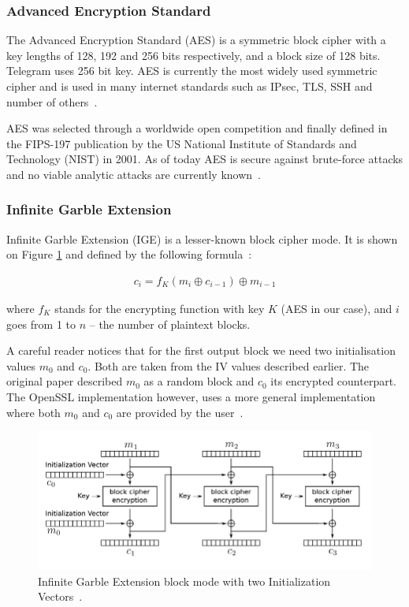 \documentclass[thesis=M,english]{FITthesis}[2012/10/20]
\begin{document}
\subsubsection{Advanced Encryption Standard}

The Advanced Encryption Standard (AES) is a symmetric block cipher with a key lengths of 128, 192 and 256 bits respectively, and a block size of 128 bits. Telegram uses 256 bit key. AES is currently the most widely used symmetric cipher and is used in many internet standards such as IPsec, TLS, SSH and number of others~\cite{understanding-crypto}.

AES was selected through a worldwide open competition and finally defined in the FIPS-197 publication by the US National Institute of Standards and Technology (NIST) in 2001. As of today AES is secure against brute-force attacks and no viable analytic attacks are currently known~\cite{understanding-crypto}.

\subsubsection{Infinite Garble Extension}

Infinite Garble Extension (IGE) is a lesser-known block cipher mode. It is shown on Figure \ref{img:crypto-regular-ige-enc} and defined by the following formula~\cite{telegram-openssl-ige}:

\begin{gather*}
c_i = f_K(m_i \oplus c_{i-1}) \oplus m_{i-1}
\end{gather*}

where $f_K$ stands for the encrypting function with key $K$ (AES in our case), and $i$ goes from 1 to $n$ -- the number of plaintext blocks.

A careful reader notices that for the first output block we need two initialisation values $m_0$ and $c_0$. Both are taken from the IV values described earlier. The original paper described $m_0$ as a random block and $c_0$ its encrypted counterpart. The OpenSSL implementation however, uses a more general implementation where both $m_0$ and $c_0$ are provided by the user~\cite{telegram-openssl-ige}.

\begin{figure}[htb]
	\centering
	\includegraphics[width=1\textwidth]{ige-enc.pdf}
	\caption[IGE block cipher mode]{Infinite Garble Extension block mode with two Initialization Vectors~\cite{telegram-aarhus}.}
	\label{img:crypto-regular-ige-enc}
\end{figure}
\end{document}
